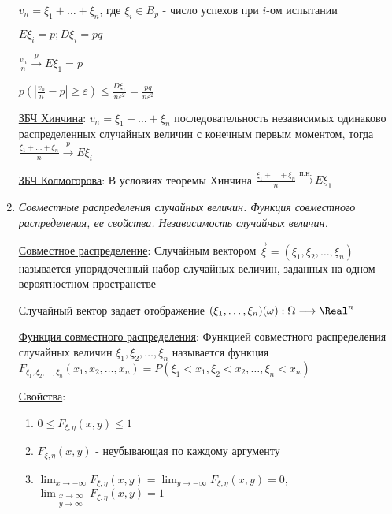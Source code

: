 \begin{enumerate}
    \begin{MyProof}
        $v_n = \xi_1 + \dots + \xi_n$, где $\xi_i \in B_p$ - число успехов при $i$-ом испытании

        $E\xi_i = p; D\xi_i = pq$

        $\frac{v_n}{n} \overset{p}{\longrightarrow} E\xi_1 = p$

        $p\left(\left|\frac{v_n}{n} - p\right| \geq \varepsilon\right) \leq \frac{D\xi_1}{n\varepsilon^2} = \frac{pq}{n\varepsilon^2}$
    \end{MyProof}

    \hyperlink{lawofbignumberskhinchin}{ЗБЧ Хинчина}: \Ths $v_n = \xi_1 + \dots + \xi_n$ последовательность независимых одинаково распределенных случайных величин с конечным первым моментом, тогда
    $\frac{\xi_1 + \dots + \xi_n}{n} \overset{p}{\longrightarrow} E\xi_i$

    \hyperlink{lawofbignumberskolmogorov}{ЗБЧ Колмогорова}: В условиях теоремы Хинчина $\frac{\xi_1 + \dots + \xi_n}{n} \overset{\text{п.н.}}{\longrightarrow} E\xi_1$

    \item \textit{Совместные распределения случайных величин. Функция совместного распределения, ее свойства. Независимость случайных величин.}
    
    \hyperlink{jointdistribution}{Совместное распределение}: Случайным вектором $\vec{\xi} = (\xi_1, \xi_2, \dots, \xi_n)$ называется упорядоченный набор случайных величин, заданных
    на одном вероятностном пространстве

    Случайный вектор задает отображение $(\xi_1, \dots, \xi_n) (\omega) : \Omega \longrightarrow \Real^n$

    \hyperlink{jointdistributionfunction}{Функция совместного распределения}: Функцией совместного распределения случайных величин $\xi_1, \xi_2, \dots, \xi_n$ называется функция 
    $F_{\xi_1, \xi_2, \dots, \xi_n}(x_1, x_2, \dots, x_n) = P(\xi_1 < x_1, \xi_2 < x_2, \dots, \xi_n < x_n)$

    \hyperlink{jointdistributionfunctionproperties}{Свойства}: 

    \begin{enumerate}
        \item $0 \leq F_{\xi, \eta}(x, y) \leq 1$
        \item $F_{\xi, \eta}(x, y)$ - неубывающая по каждому аргументу
        \item $\lim_{x \to -\infty} F_{\xi, \eta}(x, y) = \lim_{y \to -\infty} F_{\xi, \eta}(x, y) = 0, $
        $\lim_{\substack{x \to \infty \\ y \to \infty}} F_{\xi, \eta}(x, y) = 1$


\end{enumerate}
\end{enumerate}
